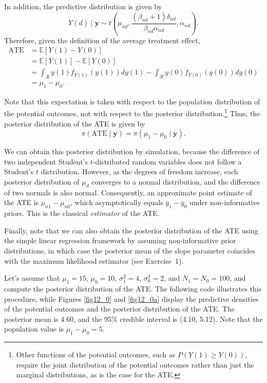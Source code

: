 In addition, the predictive distribution is given by
\[
Y(d)\mid \mathbf{y}\sim t\left(\mu_{nd},\frac{(\beta_{nd}+1)\delta_{nd}}{\beta_{nd}\alpha_{nd}},\alpha_{nd}\right).
\]
Therefore, given the definition of the average treatment effect, 
\begin{align*}
 \text{ATE} & = \mathbb{E}[Y(1) - Y(0)]\\
 & = \mathbb{E}[Y(1)] - \mathbb{E}[Y(0)]\\
 & = \int_{\mathcal{R}} y(1) f_{Y(1)}(y(1))dy(1) - \int_{\mathcal{R}} y(0) f_{Y(0)}(y(0))dy(0)\\
 & = \mu_{1} - \mu_{0}.
\end{align*}

Note that this expectation is taken with respect to the population distribution of the potential outcomes, not with respect to the posterior distribution.\footnote{Other functions of the potential outcomes, such as $P(Y(1)\geq Y(0))$, require the joint distribution of the potential outcomes rather than just the marginal distributions, as is the case for the ATE.} Thus, the posterior distribution of the ATE is given by 
\[
\pi(\text{ATE}\mid \mathbf{y}) = \pi(\mu_{1} - \mu_{0}\mid \mathbf{y}).
\]

We can obtain this posterior distribution by simulation, because the difference of two independent Student's $t$-distributed random variables does not follow a Student's $t$ distribution. However, as the degrees of freedom increase, each posterior distribution of $\mu_{d}$ converges to a normal distribution, and the difference of two normals is also normal. Consequently, an approximate point estimate of the ATE is $\mu_{n1} - \mu_{n0}$, which asymptotically equals $\bar{y}_1 - \bar{y}_0$ under non-informative priors. This is the classical \textit{estimator} of the ATE.

Finally, note that we can also obtain the posterior distribution of the ATE using the simple linear regression framework by assuming non-informative prior distributions, in which case the posterior mean of the slope parameter coincides with the maximum likelihood estimator (see Exercise~1).

Let's assume that $\mu_1 = 15$, $\mu_0 = 10$, $\sigma_1^2 = 4$, $\sigma_0^2 = 2$, and $N_1=N_0=100$, and compute the posterior distribution of the ATE. The following code illustrates this procedure, while Figures \ref{fig12_0} and \ref{fig12_0a} display the predictive densities of the potential outcomes and the posterior distribution of the ATE. The posterior mean is 4.60, and the 95\% credible interval is (4.10, 5.12). Note that the population value is $\mu_1-\mu_0=5$.

